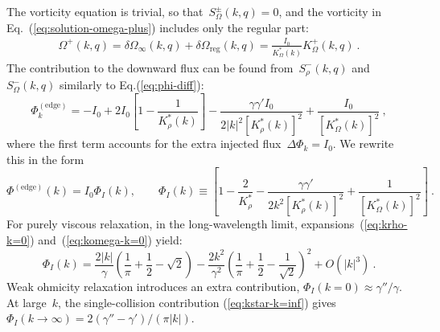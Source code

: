 \documentclass[preprint,aps,eqsecnum]{revtex4-1}
\newcommand{\fplus}[1]{{#1}^{+}}
\newcommand{\fminus}[1]{{#1}^{-}}
\newcommand{\fplusminus}[1]{{#1}^{\pm}}
\begin{document}
The vorticity equation is trivial, so that~$\fplusminus{S}_\Omega(k, q) = 0$,
and the vorticity in Eq.~(\ref{eq:solution-omega-plus}) includes
only the regular part: 
\begin{align}
  \fplus{\Omega}(k, q)
  = \delta\Omega_\infty(k, q) + \delta\Omega_\mathrm{reg}(k, q)
  = \frac{I_0}{K_\Omega^\ast(k)} \fplus{K}_\Omega (k, q)\ .
\end{align}
The contribution to the downward flux can be found from~$\fminus{S}_\rho(k, q)$
and~$\fminus{S}_\Omega(k, q)$ similarly to Eq.(\ref{eq:phi-diff}):
\begin{equation}
  \Phi^\mathrm{(edge)}_{k} =  -I_0
  + 2 I_0 \left[1 - \frac{1}{K_\rho^\ast(k)}\right]
  - \frac{\gamma \gamma' I_0}{2|k|^2 \left[K_\rho^\ast(k)\right]^2}
  + \frac{I_0}{\left[K_\Omega^\ast(k)\right]^2}
\ , 
\end{equation}
where the first term accounts for
the extra injected flux~$\Delta\Phi_k = I_0$.
We rewrite this in the form
\begin{equation}
  \label{eq:phi-iso-surf}
  \Phi^\mathrm{(edge)}(k) =
  I_0 \Phi_I(k), \qquad
  \Phi_I(k) \equiv \left[1  - \frac{2}{K_\rho^\ast}
    - \frac{\gamma \gamma'}{2k^2 \left[K_\rho^\ast(k)\right]^2}
    + \frac{1}{\left[K_\Omega^\ast(k)\right]^2}
  \right]\ .
\end{equation}
%
For purely viscous relaxation, in the long-wavelength limit,
expansions~(\ref{eq:krho-k=0}) and~(\ref{eq:komega-k=0}) yield:
\begin{equation}
  \label{eq:phi-I-low}
  \Phi_I(k) = \frac{2|k|}{\gamma} \left(\frac{1}{\pi} + \frac{1}{2}
    - \sqrt{2}\right)
  - \frac{2k^2}{\gamma^2}
    \left(\frac{1}{\pi} + \frac{1}{2} - \frac{1}{\sqrt{2}}\right)^2
    + O(|k|^3)
\ .
\end{equation}
Weak ohmicity relaxation introduces an extra contribution,
$\Phi_I(k = 0) \approx \gamma'' / \gamma$.
At large~$k$, the single-collision contribution (\ref{eq:kstar-k=inf}) gives
$\Phi_I(k\to \infty) = 2 (\gamma'' - \gamma')/(\pi |k|)$.
\end{document}
